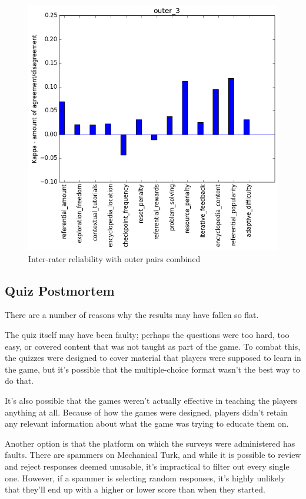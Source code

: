 			\begin{figure}[] 
				\centering 
				\includegraphics[width=\textwidth]{outer_3_stats.png} 
				\caption{Inter-rater reliability with outer pairs combined}
			\end{figure}

		\subsection{Quiz Postmortem}
			There are a number of reasons why the results may have fallen so flat.

			The quiz itself may have been faulty; perhaps the questions were too hard, too easy, or covered content that was not taught as part of the game. To combat this, the quizzes were designed to cover material that players were supposed to learn in the game, but it's possible that the multiple-choice format wasn't the best way to do that.

			It's also possible that the games weren't actually effective in teaching the players anything at all. Because of how the games were designed, players didn't retain any relevant information about what the game was trying to educate them on.

			Another option is that the platform on which the surveys were administered has faults. There are spammers on Mechanical Turk, and while it is possible to review and reject responses deemed unusable, it's impractical to filter out every single one. However, if a spammer is selecting random responses, it's highly unlikely that they'll end up with a higher or lower score than when they started. 

